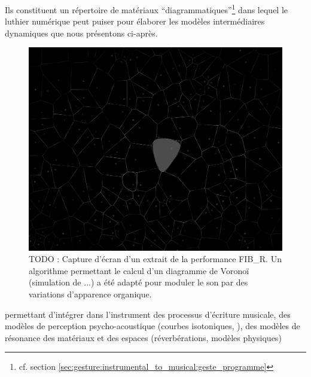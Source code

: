 Ils constituent un répertoire de matériaux ``diagrammatiques''\footnote{cf. section \ref{sec:gesture:instrumental_to_musical:geste_programme}} dans lequel le luthier numérique peut puiser pour élaborer les modèles intermédiaires dynamiques que nous présentons ci-après.



\begin{figure}[!htbp]
	\captionsetup{format=plain}
	\includegraphics[width=\textwidth]{gfx/04_algorithms/FIBR-Voronoi.jpg}
	\caption[TODO]{TODO : Capture d'écran d'un extrait de la performance FIB\_R. Un algorithme permettant le calcul d'un diagramme de Voronoï (simulation de ...) a été adapté pour moduler le son par des variations d'apparence organique.}
	\label{fig:algorithms:FIBR-patch}
\end{figure}



permettant d'intégrer dans l'instrument des processus d'écriture musicale, des modèles de perception psycho-acoustique (courbes isotoniques, ), des modèles de résonance des matériaux et des espaces (réverbérations, modèles physiques)


